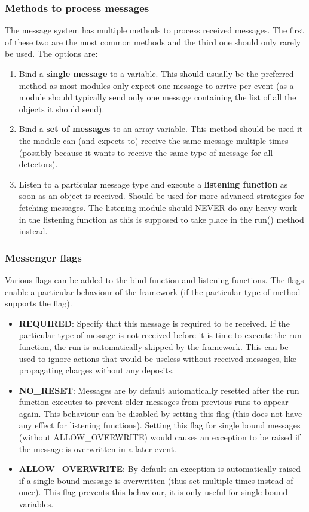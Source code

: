 \subsubsection{Methods to process messages}
The message system has multiple methods to process received messages. The first of these two are the most common methods and the third one should only rarely be used. The options are:
\begin{enumerate}
\item Bind a \textbf{single message} to a variable. This should usually be the preferred method as most modules only expect one message to arrive per event (as a module should typically send only one message containing the list of all the objects it should send).
\item Bind a \textbf{set of messages} to an array variable. This method should be used it the module can (and expects to) receive the same message multiple times (possibly because it wants to receive the same type of message for all detectors). 
\item Listen to a particular message type and execute a \textbf{listening function} as soon as an object is received. Should be used for more advanced strategies for fetching messages. The listening module should NEVER do any heavy work in the listening function as this is supposed to take place in the run() method instead.
\end{enumerate}

\subsubsection{Messenger flags}
Various flags can be added to the bind function and listening functions. The flags enable a particular behaviour of the framework (if the particular type of method supports the flag).
\begin{itemize}
\item \textbf{REQUIRED}: Specify that this message is required to be received. If the particular type of message is not received before it is time to execute the run function, the run is automatically skipped by the framework. This can be used to ignore actions that would be useless without received messages, like propagating charges without any deposits.
\item \textbf{NO\_RESET}: Messages are by default automatically resetted after the run function executes to prevent older messages from previous runs to appear again. This behaviour can be disabled by setting this flag (this does not have any effect for listening functions). Setting this flag for single bound messages (without ALLOW\_OVERWRITE) would causes an exception to be raised if the message is overwritten in a later event.
\item \textbf{ALLOW\_OVERWRITE}: By default an exception is automatically raised if a single bound message is overwritten (thus set multiple times instead of once). This flag prevents this behaviour, it is only useful for single bound variables. 
\end{itemize}

